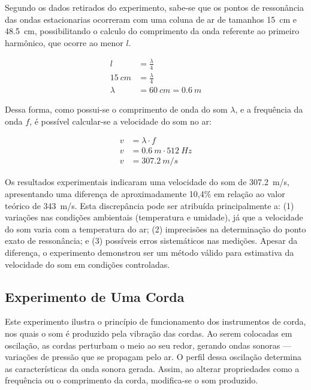 Segundo os dados retirados do experimento, sabe-se que os pontos de ressonância das ondas estacionarias ocorreram com uma coluna de ar de tamanhos \qty{15}{cm} e \qty{48,5}{cm}, possibilitando o calculo do comprimento da onda referente ao primeiro harmônico, que ocorre ao menor \(l\).

\begin{align*}
	l &= \frac{\lambda}{4}\\
	\qty{15}{cm} &= \frac{ \lambda}{4}\\
	\lambda &= \qty{60}{cm} = \qty{0,6}{m}
\end{align*}

Dessa forma, como possui-se o comprimento de onda do som \(\lambda\), e a frequência da onda \(f\), é possível calcular-se a velocidade do som no ar:

\begin{align*}
	v &= \lambda \cdot f\\
	v &= \qty{0,6}{m} \cdot \qty{512}{Hz} \\
	v &= \qty{307,2}{m/s}
\end{align*}

Os resultados experimentais indicaram uma velocidade do som de \qty{307,2}{m/s}, apresentando uma diferença de aproximadamente 10,4\% em relação ao valor teórico de \qty{343}{m/s}. Esta discrepância pode ser atribuída principalmente a: (1) variações nas condições ambientais (temperatura e umidade), já que a velocidade do som varia com a temperatura do ar; (2) imprecisões na determinação do ponto exato de ressonância; e (3) possíveis erros sistemáticos nas medições. Apesar da diferença, o experimento demonstrou ser um método válido para estimativa da velocidade do som em condições controladas.

\subsection{Experimento de Uma Corda}
Este experimento ilustra o princípio de funcionamento dos instrumentos de corda, nos quais o som é produzido pela vibração das cordas. Ao serem colocadas em oscilação, as cordas perturbam o meio ao seu redor, gerando ondas sonoras — variações de pressão que se propagam pelo ar. O perfil dessa oscilação determina as características da onda sonora gerada. Assim, ao alterar propriedades como a frequência ou o comprimento da corda, modifica-se o som produzido.

